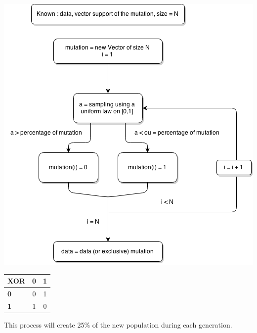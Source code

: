 \documentclass{report}
\begin{document}
		\vspace{1cm}
		\begin{center}
			\includegraphics[scale=0.65]{ressources/ag2}
		\end{center}
		\newpage
		
		\begin{center}
			\begin{tabular}{|l|c|c|}
				\hline \textbf{XOR} & \textbf{0} & \textbf{1}\\
				\hline \textbf{0} & 0 & 1\\
				\hline \textbf{1} & 1 & 0\\
				\hline
			\end{tabular}
		\end{center}
		\vspace{0.5cm}
		
		This process will create 25\% of the new population during each generation.
		
\end{document}
